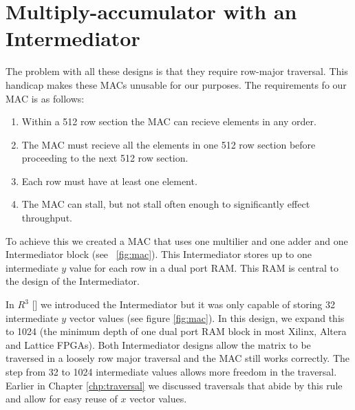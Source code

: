 \section{Multiply-accumulator with an Intermediator}
\label{sec:intermediator}
The problem with all these designs is that they require row-major traversal. This handicap makes these MACs unusable for our purposes. The requirements fo our MAC is as follows:
\begin{enumerate}
    \item Within a 512 row section the MAC can recieve elements in any order.
    \item The MAC must recieve all the elements in one 512 row section before proceeding to the next 512 row section.
    \item Each row must have at least one element.
    \item The MAC can stall, but not stall often enough to significantly effect throughput.

\end{enumerate}
To achieve this we created a MAC that uses one multilier and one adder and one Intermediator block (see \figurename~\ref{fig:mac}). This Intermediator stores up to one intermediate $y$ value for each row in a dual port RAM. This RAM is central to the design of the Intermediator.

\par In $R^3$ [\cite{prelim:townsend}] we introduced the Intermediator but it was only capable of storing 32 intermediate $y$ vector values (see figure \ref{fig:mac}). In this design, we expand this to 1024 (the minimum depth of one dual port RAM block in most Xilinx, Altera and Lattice FPGAs). Both Intermediator designs allow the matrix to be traversed in a loosely row major traversal and the MAC still works correctly. The step from 32 to 1024 intermediate values allows more freedom in the traversal. Earlier in Chapter \ref{chp:traversal} we discussed traversals that abide by this rule and allow for easy reuse of $x$ vector values.


